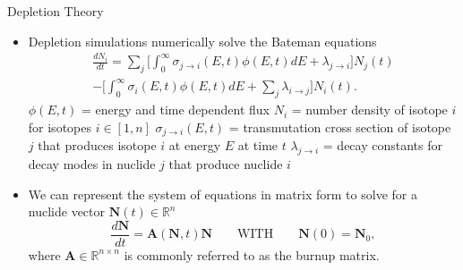 \documentclass[9pt,t,aspectratio=169]{beamer}
\newcommand{\QWITH}{\qquad \text{WITH} \qquad}
\begin{document}
\begin{frame}{Depletion Theory}
    \begin{itemize}
        \item Depletion simulations numerically solve the Bateman equations
        \begin{multline} \label{eq:batemen}
            \frac{dN_{i}}{dt} =
            \sum_{j} \bigg[\int_{0}^{\infty} \sigma_{j\rightarrow{i}}(E,t)\phi(E,t)dE + \lambda_{j\rightarrow{i}}\bigg]N_{j}(t) \\
            -\bigg[\int_{0}^{\infty} \sigma_{i}(E,t)\phi(E,t)dE
            +\sum_{j}\lambda_{i\rightarrow{j}}\bigg] N_{i}(t).
        \end{multline}
        $\phi(E,t)$ = energy and time dependent flux
        $N_{i}$ = number density of isotope $i$ for isotopes $i\in[1,n]$
        $\sigma_{j\rightarrow{i}}(E,t)$ = transmutation cross section of isotope $j$ that produces isotope $i$ at energy $E$ at time $t$
        $\lambda_{j\rightarrow{i}}$ = decay constants for decay modes in nuclide $j$ that produce nuclide $i$
        \item We can represent the system of equations in matrix form to solve for a nuclide vector $\textbf{N}(t)\in\mathbb{R}^{n}$
        \begin{equation} \label{eq:burnup matrix odes}
            \frac{d\textbf{N}}{dt} =
            \textbf{A}(\textbf{N},t) \textbf{N}
            \QWITH
            \textbf{N}(0) = \textbf{N}_{0},
        \end{equation}
        where $\textbf{A}\in\mathbb{R}^{n\times n}$ is commonly referred to as the burnup matrix.
    \end{itemize}
\end{frame}
\end{document}

